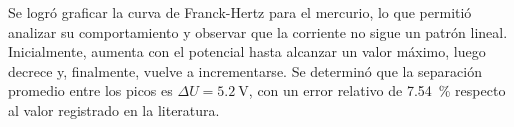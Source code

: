 Se logró graficar la curva de Franck-Hertz para el mercurio, lo que permitió analizar su comportamiento y observar que la corriente no sigue un patrón lineal. Inicialmente, aumenta con el potencial hasta alcanzar un valor máximo, luego decrece y, finalmente, vuelve a incrementarse. Se determinó que la separación promedio entre los picos es \( \Delta U = \qty{5.2}{\volt} \), con un error relativo de \qty{7.54}{\percent} respecto al valor registrado en la literatura.
